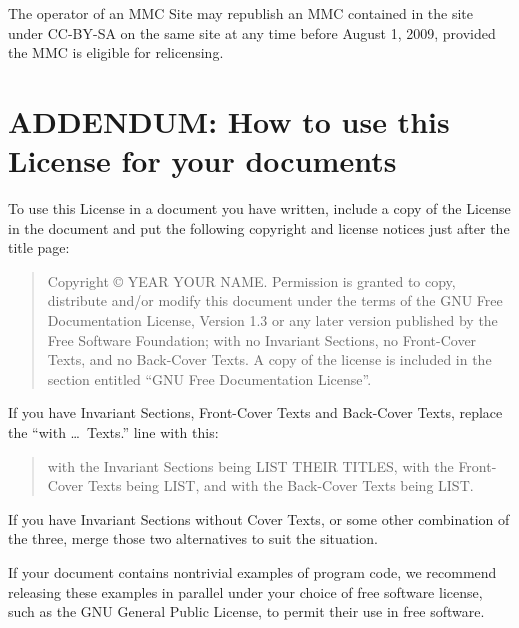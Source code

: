 \documentclass[a4paper,12pt]{book}
\theoremstyle{mes_exemples}	\newtheorem{exemple}[numtho]{Exemple}
\theoremstyle{mes_tho}
\begin{document}
The operator of an MMC Site may republish an MMC contained in the site
under CC-BY-SA on the same site at any time before August 1, 2009,
provided the MMC is eligible for relicensing.

\section{ADDENDUM: How to use this License for your documents}

To use this License in a document you have written, include a copy of
the License in the document and put the following copyright and
license notices just after the title page:

\bigskip
\begin{quote}
    Copyright \copyright{}  YEAR  YOUR NAME.
    Permission is granted to copy, distribute and/or modify this document
    under the terms of the GNU Free Documentation License, Version 1.3
    or any later version published by the Free Software Foundation;
    with no Invariant Sections, no Front-Cover Texts, and no Back-Cover Texts.
    A copy of the license is included in the section entitled ``GNU
    Free Documentation License''.
\end{quote}
\bigskip
    
If you have Invariant Sections, Front-Cover Texts and Back-Cover Texts,
replace the ``with \dots\ Texts.'' line with this:

\bigskip
\begin{quote}
    with the Invariant Sections being LIST THEIR TITLES, with the
    Front-Cover Texts being LIST, and with the Back-Cover Texts being LIST.
\end{quote}
\bigskip
    
If you have Invariant Sections without Cover Texts, or some other
combination of the three, merge those two alternatives to suit the
situation.

If your document contains nontrivial examples of program code, we
recommend releasing these examples in parallel under your choice of
free software license, such as the GNU General Public License,
to permit their use in free software.
\end{document}
